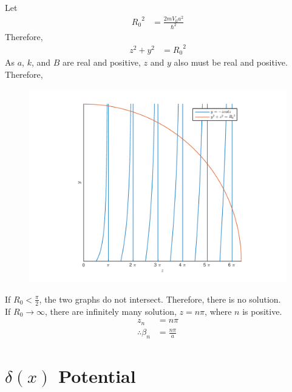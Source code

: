 \documentclass[titlepage, fleqn, a4paper, 12pt, twoside]{article}
\theoremstyle{definition}
\theoremstyle{theorem}
\let\Oldsection\section
\renewcommand{\section}{\FloatBarrier\Oldsection}
\begin{document}
Let
\begin{align*}
	{R_0}^2 &= \frac{2 m V_0 a^2}{\hbar^2}
\end{align*}
Therefore,
\begin{align*}
	z^2 + y^2 &= {R_0}^2
\end{align*}
As $a$, $k$, and $B$ are real and positive, $z$ and $y$ also must be real and positive.\\
Therefore,
\begin{figure}[H]
	\centering
	\includegraphics[width = \textwidth]{fig-graphical_solution_for_allowed_energy_levels_for_odd_wave_functions_in_finite_potential_well.pdf}
\end{figure}
If $R_0 < \frac{\pi}{2}$, the two graphs do not intersect.
Therefore, there is no solution.\\
If $R_0 \to \infty$, there are infinitely many solution, $z = n \pi$, where $n$ is positive.
\begin{align*}
	z_n &= n \pi\\
	\therefore \beta_n &= \frac{n \pi}{a}
\end{align*}

\section{$\delta(x)$ Potential}
\end{document}
